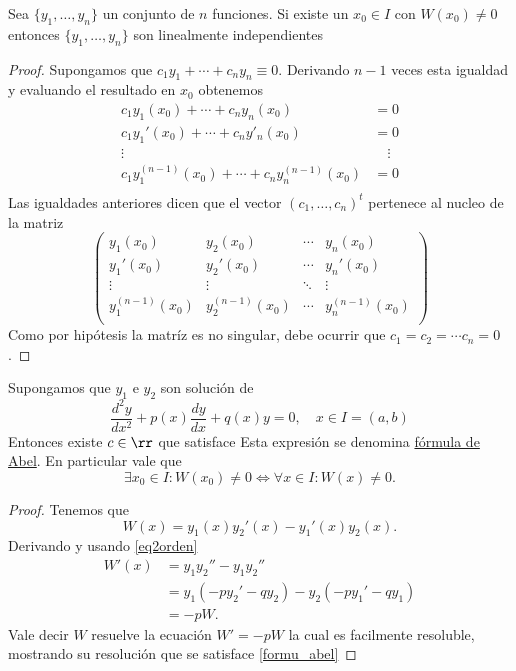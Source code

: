 \begin{lema}
 Sea $\{y_1,\ldots,y_n\}$ un conjunto de $n$ funciones. Si existe un $x_0\in I$ con $W(x_0)\neq 0$ entonces $\{y_1,\ldots,y_n\}$ son
linealmente independientes
\end{lema}


\begin{proof} Supongamos que $c_1y_1+\cdots+c_ny_n\equiv 0$. Derivando $n-1$ veces esta igualdad y evaluando el resultado en $x_0$ obtenemos
\[
\begin{split}
c_1y_1(x_0)+\cdots+c_ny_n(x_0)&=0\\
c_1y_1'(x_0)+\cdots+c_ny'_n(x_0)&=0\\
\vdots \quad& \quad\vdots\\
c_1y_1^{(n-1)}(x_0)+\cdots+c_ny^{(n-1)}_n(x_0)&=0\\
\end{split}
\]
Las igualdades anteriores dicen que el vector $(c_1,\ldots,c_n)^t$ pertenece al nucleo de la matriz
\[
\begin{pmatrix}
y_1(x_0) & y_2(x_0) & \cdots &y_n(x_0)\\
y_1'(x_0) & y_2'(x_0) & \cdots &y_n'(x_0)\\
\vdots & \vdots &\ddots& \vdots\\
y_1^{(n-1)}(x_0) & y_2^{(n-1)}(x_0) & \cdots &y_n^{(n-1)}(x_0)\\
\end{pmatrix}
\]
Como por hipótesis la matríz es no singular, debe ocurrir que $c_1=c_2=\cdots c_n=0$.
\end{proof}

\begin{teorema}{}
 Supongamos que $y_1$ e $y_2$ son solución de
\begin{equation}\label{eq2orden}\frac{d^2y}{dx^2}+p(x)\frac{dy}{dx}+q(x)y=0,\quad x\in I=(a,b)\end{equation}
Entonces existe $c\in\rr$ que satisface
Esta expresión se denomina \href{http://en.wikipedia.org/wiki/Abel's_identity}{fórmula de Abel}. En particular vale que
\[\exists x_0\in I: W(x_0)\neq 0 \Longleftrightarrow \forall x\in I: W(x)\neq 0 .\]
\end{teorema}

\begin{proof} Tenemos que
\[W(x)=y_1(x)y_2'(x)-y_1'(x)y_2(x).\]
Derivando y usando \eqref{eq2orden}
\[\begin{split}W'(x)&=y_1y_2''-y_1y_2''\\
&=y_1(-py_2'-qy_2)-y_2(-py_1'-qy_1)\\
&=-pW.
\end{split}
\]
Vale decir $W$ resuelve la ecuación $W'=-pW$ la cual es facilmente resoluble, mostrando su resolución que se satisface \eqref{formu_abel}
\end{proof}

